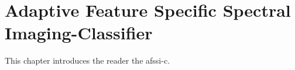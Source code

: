 \chapter{Adaptive Feature Specific Spectral Imaging-Classifier}\label{chap:Afssic}

This chapter introduces the reader the \gls{afssi-c}.


%  
%



